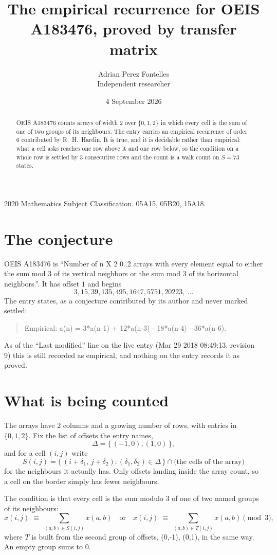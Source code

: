 \documentclass[11pt,a4paper]{article}
\title{The empirical recurrence for OEIS A183476, proved by transfer matrix}
\author{Adrian Perez Fontelles\\ \small Independent researcher}
\date{4 September 2026}
\theoremstyle{plain}
\theoremstyle{definition}
\begin{document}
\maketitle

\begin{abstract}
OEIS A183476 counts arrays of width $2$ over $\{0,1,2\}$ in which every cell is the sum of one of two groups of its neighbours. The entry carries an
empirical recurrence of order $6$ contributed by R.~H.~Hardin. It is true, and it is
decidable rather than empirical: what a cell asks reaches one row above
it and one row below, so the condition on a whole row is settled by
$3$ consecutive rows and the count is a walk count on $S=73$ states.
\end{abstract}

\noindent\small 2020 Mathematics Subject Classification. 05A15, 05B20, 15A18.\normalsize

\section{The conjecture}

OEIS A183476 is ``Number of n X 2 0..2 arrays with every element equal to either the sum mod 3 of its vertical neighbors or the sum mod 3 of its horizontal neighbors.''. It has offset $1$ and begins
\[
3, 15, 39, 135, 495, 1647, 5751, 20223,\ \dots
\]
The entry states, as a conjecture contributed by its author and never marked settled:
\begin{quote}
Empirical: a(n) = 3*a(n-1) + 12*a(n-3) - 18*a(n-4) - 36*a(n-6).
\end{quote}
As of the ``Last modified'' line on the live entry (Mar 29 2018 08:49:13, revision 9) this is still
recorded as empirical, and nothing on the entry records it as proved.

\section{What is being counted}

The arrays have $2$ columns and a growing number of rows, with entries in $\{0,1,2\}$. Fix the
list of offsets the entry names,
\[
\Delta=\{\,(-1,0), (1,0)\,\},
\]
and for a cell $(i,j)$ write
\[
S(i,j)=\{\,(i+\delta_1,\,j+\delta_2) : (\delta_1,\delta_2)\in\Delta\,\}\cap
\text{(the cells of the array)}
\]
for the neighbours it actually has. Only offsets landing inside the array count, so a cell on
the border simply has fewer neighbours.

The condition is that every cell is the sum modulo $3$ of one of two named groups of its neighbours:
\[
x(i,j)\;\equiv\;\sum_{(a,b)\in S(i,j)}x(a,b) \quad\text{or}\quad x(i,j)\;\equiv\;\sum_{(a,b)\in T(i,j)}x(a,b) \pmod{3},
\]
where $T$ is built from the second group of offsets, (0,-1), (0,1), in the same way. An empty group sums to $0$.
\end{document}
